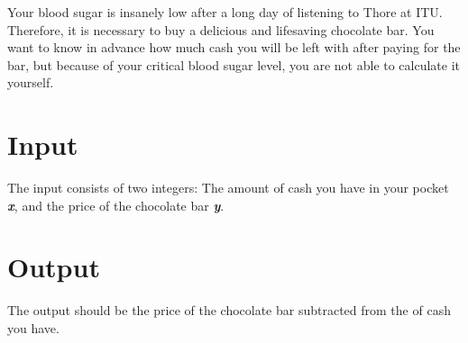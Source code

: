 

Your blood sugar is insanely low after a long day of listening to Thore at ITU. Therefore, it is necessary to buy a delicious and lifesaving chocolate bar. You want to know in advance how much cash you will be left with after paying for the bar, but because of your critical blood sugar level, you are not able to calculate it yourself. 

\section*{Input}

The input consists of two integers: The amount of cash you have in your pocket \textbf{\textit{x}}, and the price of the chocolate bar \textbf{\textit{y}}.

\section*{Output}

The output should be the price of the chocolate bar subtracted from the of cash you have.